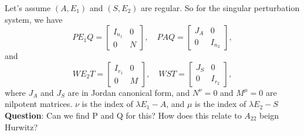 \documentclass{article}
\begin{document}
Let's assume $(A, E_1)$ and $(S, E_2)$ are regular. So for the singular perturbation system, we have 
\begin{equation}
P E_1 Q = \begin{bmatrix}
I_{n_1} & 0 \\
0 & N
\end{bmatrix}, \quad
P A Q = \begin{bmatrix}
J_A & 0 \\
0 & I_{n_2}
\end{bmatrix},
\end{equation}
and
\begin{equation}
W E_2 T = \begin{bmatrix}
I_{r_1} & 0 \\
0 & M
\end{bmatrix}, \quad
W S T = \begin{bmatrix}
J_S & 0 \\
0 & I_{r_2}
\end{bmatrix},
\end{equation}
where \(J_A\) and \(J_S\) are in Jordan canonical form, and \(N^\nu = 0\) and \(M^\mu = 0\) are nilpotent matrices. 
$\nu$ is the index of $\lambda E_1 - A$, and $\mu$ is the index of $\lambda E_2 - S$
\newline
\textbf{Question}: Can we find P and Q for this? How does this relate to $A_{22}$ beign Hurwitz?
\end{document}

